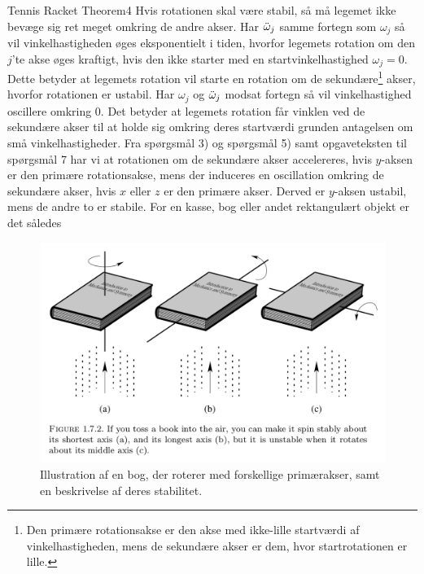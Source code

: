 \begin{opgave}{Tennis Racket Theorem}{4}
\opg Hvis rotationen skal være stabil, så må legemet ikke bevæge sig ret meget omkring de andre akser. Har $\ddot{\omega}_j$ samme fortegn som $\omega_j$ så vil vinkelhastigheden øges eksponentielt i tiden, hvorfor legemets rotation om den $j$'te akse øges kraftigt, hvis den ikke starter med en startvinkelhastighed $\omega_j = 0$. Dette betyder at legemets rotation vil starte en rotation om de sekundære\footnote{Den primære rotationsakse er den akse med ikke-lille startværdi af vinkelhastigheden, mens de sekundære akser er dem, hvor startrotationen er lille.} akser, hvorfor rotationen er ustabil. Har $\omega_j$ og $\ddot{\omega}_j$ modsat fortegn så vil vinkelhastighed oscillere omkring 0. Det betyder at legemets rotation får vinklen ved de sekundære akser til at holde sig omkring deres startværdi grunden antagelsen om små vinkelhastigheder.
\opg Fra spørgsmål 3) og spørgsmål 5) samt opgaveteksten til spørgsmål 7 har vi at rotationen om de sekundære akser accelereres, hvis $y$-aksen er den primære rotationsakse, mens der induceres en oscillation omkring de sekundære akser, hvis $x$ eller $z$ er den primære akser. Derved er $y$-aksen ustabil, mens de andre to er stabile.
\opg For en kasse, bog eller andet rektangulært objekt er det således
%
%
\begin{figure}[!h]
\centering
\includegraphics[width=.85\columnwidth]{Analytisk-Mekanik/Rotationsakser.png}
\caption{Illustration af en bog, der roterer med forskellige primærakser, samt en beskrivelse af deres stabilitet.}
\end{figure}
\end{opgave}
%
%
